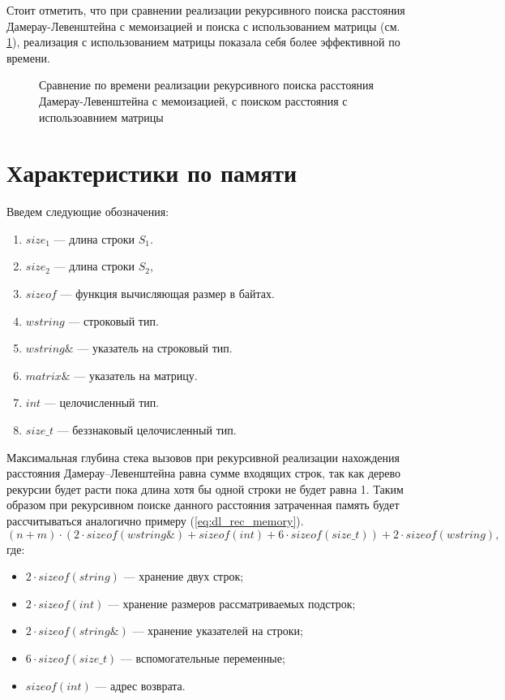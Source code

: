 Стоит отметить, что при сравнении реализации рекурсивного поиска расстояния Дамерау-Левенштейна с  мемоизацией и поиска
с использованием матрицы (см. \ref{plt:time_mat_rec_cmp}), реализация с использованием матрицы показала себя более эффективной
по времени. 

\begin{figure}[H]
	\centering
	
	\caption{Сравнение по времени реализации рекурсивного поиска расстояния Дамерау-Левенштейна с  мемоизацией, с поиском
	расстояния с использоавнием матрицы}
	\label{plt:time_mat_rec_cmp}
\end{figure}


\section{Характеристики по памяти}

Введем следующие обозначения:
\begin{enumerate}
	\item $size_{1}$ --- длина строки $S_{1}$.
	\item $size_{2}$ --- длина строки $S_{2}$,
	\item $sizeof$ --- функция вычисляющая размер в байтах.
	\item $wstring$ --- строковый тип.
	\item $wstring\&$ --- указатель на строковый тип.
	\item $matrix\&$ --- указатель на матрицу.
	\item $int$ --- целочисленный тип.
	\item $size\_t$ --- беззнаковый целочисленный тип.
\end{enumerate}

Максимальная глубина стека вызовов при рекурсивной реализации нахождения расстояния Дамерау--Левенштейна равна сумме входящих строк,
так как дерево рекурсии будет расти пока длина хотя бы одной строки не будет равна 1. Таким образом при рекурсивном поиске данного расстояния затраченная память
будет рассчитываться  аналогично примеру (\ref{eq:dl_rec_memory}).
\begin{equation}
	\label{eq:dl_rec_memory}
	(n + m) \cdot (2 \cdot sizeof(wstring\&) + sizeof(int) + 6 \cdot sizeof(size\_t)) + 2 \cdot sizeof(wstring),
\end{equation}
где:
\begin{itemize}
	\item $2 \cdot sizeof(string)$ --- хранение двух строк;
	\item $2 \cdot sizeof(int)$ --- хранение размеров рассматриваемых подстрок;
	\item $2 \cdot sizeof(string\&)$ --- хранение указателей на строки;
	\item $6 \cdot sizeof(size\_t)$ --- вспомогательные переменные;
	\item $sizeof(int)$ --- адрес возврата.
\end{itemize}

